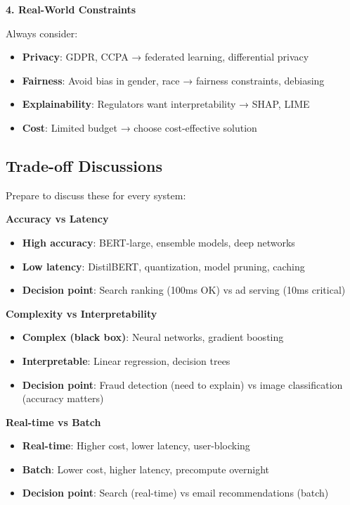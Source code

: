 \documentclass[10pt]{article}
\begin{document}
\textbf{4. Real-World Constraints}

Always consider:
\begin{itemize}
\item \textbf{Privacy}: GDPR, CCPA → federated learning, differential privacy
\item \textbf{Fairness}: Avoid bias in gender, race → fairness constraints, debiasing
\item \textbf{Explainability}: Regulators want interpretability → SHAP, LIME
\item \textbf{Cost}: Limited budget → choose cost-effective solution
\end{itemize}

\subsection{Trade-off Discussions}

Prepare to discuss these for every system:

\textbf{Accuracy vs Latency}
\begin{itemize}
\item \textbf{High accuracy}: BERT-large, ensemble models, deep networks
\item \textbf{Low latency}: DistilBERT, quantization, model pruning, caching
\item \textbf{Decision point}: Search ranking (100ms OK) vs ad serving (10ms critical)
\end{itemize}

\textbf{Complexity vs Interpretability}
\begin{itemize}
\item \textbf{Complex (black box)}: Neural networks, gradient boosting
\item \textbf{Interpretable}: Linear regression, decision trees
\item \textbf{Decision point}: Fraud detection (need to explain) vs image classification (accuracy matters)
\end{itemize}

\textbf{Real-time vs Batch}
\begin{itemize}
\item \textbf{Real-time}: Higher cost, lower latency, user-blocking
\item \textbf{Batch}: Lower cost, higher latency, precompute overnight
\item \textbf{Decision point}: Search (real-time) vs email recommendations (batch)
\end{itemize}
\end{document}
